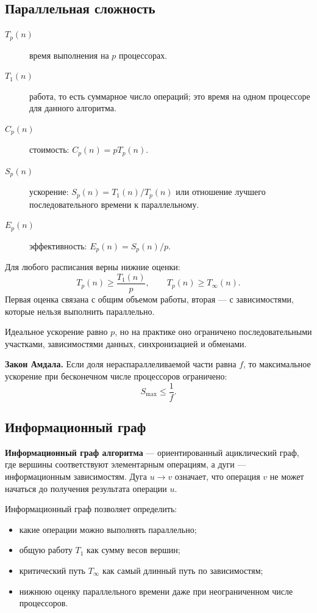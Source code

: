 \subsection*{Параллельная сложность}

\begin{description}
    \item[$T_p(n)$] время выполнения на $p$ процессорах.
    \item[$T_1(n)$] работа, то есть суммарное число операций; это время на одном процессоре для данного алгоритма.
    \item[$C_p(n)$] стоимость: $C_p(n)=pT_p(n)$.
    \item[$S_p(n)$] ускорение: $S_p(n)=T_1(n)/T_p(n)$ или отношение лучшего последовательного времени к параллельному.
    \item[$E_p(n)$] эффективность: $E_p(n)=S_p(n)/p$.
\end{description}

Для любого расписания верны нижние оценки:
\[
T_p(n) \geq \frac{T_1(n)}{p}, \qquad T_p(n) \geq T_\infty(n).
\]
Первая оценка связана с общим объемом работы, вторая --- с зависимостями, которые нельзя выполнить параллельно.

Идеальное ускорение равно $p$, но на практике оно ограничено последовательными участками, зависимостями данных, синхронизацией и обменами.

\textbf{Закон Амдала.} Если доля нераспараллеливаемой части равна $f$, то максимальное ускорение при бесконечном числе процессоров ограничено:
\[
S_{\max} \leq \frac{1}{f}.
\]

\subsection*{Информационный граф}

\textbf{Информационный граф алгоритма} --- ориентированный ациклический граф, где вершины соответствуют элементарным операциям, а дуги --- информационным зависимостям. Дуга $u \to v$ означает, что операция $v$ не может начаться до получения результата операции $u$.

Информационный граф позволяет определить:
\begin{itemize}
    \item какие операции можно выполнять параллельно;
    \item общую работу $T_1$ как сумму весов вершин;
    \item критический путь $T_\infty$ как самый длинный путь по зависимостям;
    \item нижнюю оценку параллельного времени даже при неограниченном числе процессоров.
\end{itemize}

